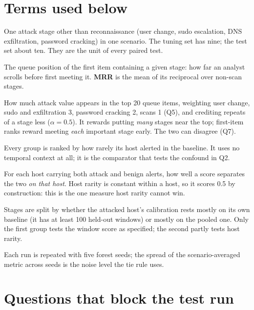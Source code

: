 \documentclass[10.5pt,a4paper]{article}
\begin{document}
\section{Terms used below}
\label{sec:terms}

\begin{description}[leftmargin=1.2em,style=nextline]
\item[Non-scan stage occurrence] One attack stage other than reconnaissance (user change, sudo escalation, DNS exfiltration, password cracking) in one scenario. The tuning set has nine; the test set about ten. They are the unit of every paired test.
\item[First-item rank] The queue position of the first item containing a given stage: how far an analyst scrolls before first meeting it. \textbf{MRR} is the mean of its reciprocal over non-scan stages.
\item[Graded $\alpha$-nDCG@20] How much attack value appears in the top 20 queue items, weighting user change, sudo and exfiltration 3, password cracking 2, scans 1 (Q5), and crediting repeats of a stage less ($\alpha = 0.5$). It rewards putting \emph{many} stages near the top; first-item ranks reward meeting \emph{each} important stage early. The two can disagree (Q7).
\item[Host rarity, B0$_\mathrm{host}$] Every group is ranked by how rarely its host alerted in the baseline. It uses no temporal context at all; it is the comparator that tests the confound in Q2.
\item[Within-host AUC] For each host carrying both attack and benign alerts, how well a score separates the two \emph{on that host}. Host rarity is constant within a host, so it scores 0.5 by construction: this is the one measure host rarity cannot win.
\item[Calibration split] Stages are split by whether the attacked host's calibration rests mostly on its own baseline (it has at least 100 held-out windows) or mostly on the pooled one. Only the first group tests the window score as specified; the second partly tests host rarity.
\item[Seed SD] Each run is repeated with five forest seeds; the spread of the scenario-averaged metric across seeds is the noise level the tie rule uses.
\end{description}

\section{Questions that block the test run}
\label{sec:blocking}
\end{document}
